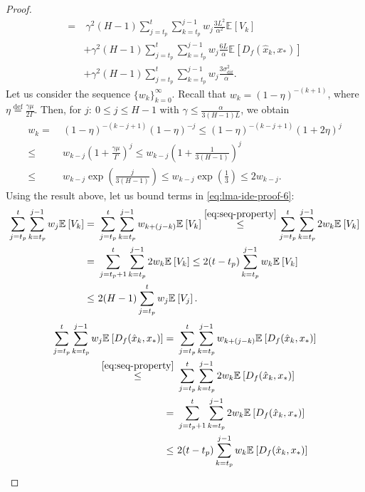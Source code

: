 \documentclass[sn-mathphys,Numbered]{sn-jnl}%
\renewcommand{\|}{\parallel}
\newcommand\ec[2][]{\ensuremath{\mathbb{E}_{#1} \left[#2\right]}}
\newcommand{\eqdef}{\overset{\text{def}}{=}}
\newcommand{\sigmaf}{\sigma_{\mathrm{dif}}}
\renewcommand {\*} {\ast}
\begin{document}
\begin{proof}
\begin{align}
       =&\ \gamma^2(H-1) \sum\limits_{j=t_p}^t \sum\limits_{k=t_p}^{j - 1}w_j \frac{3 L^2}{\alpha^2} \ec{V_k} \nonumber \\
       &+ \gamma^2(H-1) \sum\limits_{j=t_p}^t \sum\limits_{k=t_p}^{j - 1}w_j \frac{6 L}{\alpha} \ec{D_{f} (\hat{x}_k, x_\ast)} \nonumber \\
       &+ \gamma^2(H-1) \sum\limits_{j=t_p}^t \sum\limits_{k=t_p}^{j - 1}w_j \frac{3 \sigmaf^2}{\alpha}.
   \end{align}
   Let us consider the sequence $\{w_k\}_{k=0}^{\infty}$. Recall that $w_k = (1 - \eta)^{-(k+1)}$, where $\eta \eqdef \frac{\gamma\mu}{2\Gamma}$. Then, for $j:\ 0 \leq j \leq H - 1$ with $\gamma \leq \frac{\alpha}{3(H-1)L}$, we obtain
   \begin{align}
       \label{eq:seq-property}
       w_k =&\ (1 - \eta)^{-(k-j+1)}(1 - \eta)^{-j} \leq (1 - \eta)^{-(k-j+1)}(1 + 2\eta)^{j} \nonumber \\
       \leq&\ w_{k - j}\left(1 + \frac{\gamma\mu}{\Gamma}\right)^j \leq w_{k - j}\left(1 + \frac{1}{3(H-1)}\right)^j \nonumber \\ \leq&\  w_{k - j}\exp{\left(\frac{j}{3(H-1)}\right)} \leq w_{k - j}\exp{\left(\frac{1}{3}\right)} \leq 2 w_{k - j}.
   \end{align}
   Using the result above, let us bound terms in \eqref{eq:lma-ide-proof-6}:
   \begin{align}
       \label{eq:abstr-bound-1}
       \sum\limits_{j=t_p}^t \sum\limits_{k=t_p}^{j - 1}w_j \ec{V_k} =&\  \sum\limits_{j=t_p}^t \sum\limits_{k=t_p}^{j - 1}w_{k + (j - k)} \ec{V_k} \overset{\eqref{eq:seq-property}}{\leq} \sum\limits_{j=t_p}^t \sum\limits_{k=t_p}^{j - 1}2w_{k} \ec{V_k} \nonumber \\ =&\ \sum\limits_{j=t_p + 1}^t \sum\limits_{k=t_p}^{j - 1}2w_{k} \ec{V_k} \leq 2(t - t_p) \sum\limits_{k=t_p}^{j - 1}w_{k} \ec{V_k} \nonumber \\
       \leq&\ 2(H-1)\sum\limits_{j=t_p}^t w_{j} \ec{V_j}.
   \end{align}
   \begin{align}
       \label{eq:abstr-bound-2}
       \sum\limits_{j=t_p}^t \sum\limits_{k=t_p}^{j - 1}w_j \ec{D_{f} (\hat{x}_k, x_\ast)} =&\  \sum\limits_{j=t_p}^t \sum\limits_{k=t_p}^{j - 1}w_{k + (j - k)} \ec{D_{f} (\hat{x}_k, x_\ast)} \nonumber \\\overset{\eqref{eq:seq-property}}{\leq}&\ \sum\limits_{j=t_p}^t \sum\limits_{k=t_p}^{j - 1}2w_{k} \ec{D_{f} (\hat{x}_k, x_\ast)} \nonumber \\ =&\ \sum\limits_{j=t_p + 1}^t \sum\limits_{k=t_p}^{j - 1}2w_{k} \ec{D_{f} (\hat{x}_k, x_\ast)} \nonumber \\\leq&\ 2(t - t_p) \sum\limits_{k=t_p}^{j - 1}w_{k} \ec{D_{f} (\hat{x}_k, x_\ast)} \nonumber \\

\end{align}
\end{proof}
\end{document}
